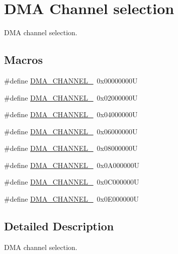 \hypertarget{group___d_m_a___channel__selection}{}\section{D\+MA Channel selection}
\label{group___d_m_a___channel__selection}


D\+MA channel selection.  


\subsection*{Macros}
\begin{DoxyCompactItemize}
\item 
\#define \hyperlink{group___d_m_a___channel__selection_gabd7de138931e93a90fc6c4eab5916bbe}{D\+M\+A\+\_\+\+C\+H\+A\+N\+N\+E\+L\+\_}~0x00000000U
\item 
\#define \hyperlink{group___d_m_a___channel__selection_ga283364370e9876af6406b9fa70e2944f}{D\+M\+A\+\_\+\+C\+H\+A\+N\+N\+E\+L\+\_}~0x02000000U
\item 
\#define \hyperlink{group___d_m_a___channel__selection_ga9688f3e78cbc2109d214b7ca049e22df}{D\+M\+A\+\_\+\+C\+H\+A\+N\+N\+E\+L\+\_}~0x04000000U
\item 
\#define \hyperlink{group___d_m_a___channel__selection_gac689673fec4d72ede49a0d657e3a7e70}{D\+M\+A\+\_\+\+C\+H\+A\+N\+N\+E\+L\+\_}~0x06000000U
\item 
\#define \hyperlink{group___d_m_a___channel__selection_ga51b51f5b39e23b28ad99520ad5be596f}{D\+M\+A\+\_\+\+C\+H\+A\+N\+N\+E\+L\+\_}~0x08000000U
\item 
\#define \hyperlink{group___d_m_a___channel__selection_gafbaa82f3cff89858e50363c04ed0cca0}{D\+M\+A\+\_\+\+C\+H\+A\+N\+N\+E\+L\+\_}~0x0\+A000000U
\item 
\#define \hyperlink{group___d_m_a___channel__selection_gad23679661d8da3bc1aaacc62f99821f7}{D\+M\+A\+\_\+\+C\+H\+A\+N\+N\+E\+L\+\_}~0x0\+C000000U
\item 
\#define \hyperlink{group___d_m_a___channel__selection_ga77ff4e8675a3991feb20e385242f34ab}{D\+M\+A\+\_\+\+C\+H\+A\+N\+N\+E\+L\+\_}~0x0\+E000000U
\end{DoxyCompactItemize}


\subsection{Detailed Description}
D\+MA channel selection. 



